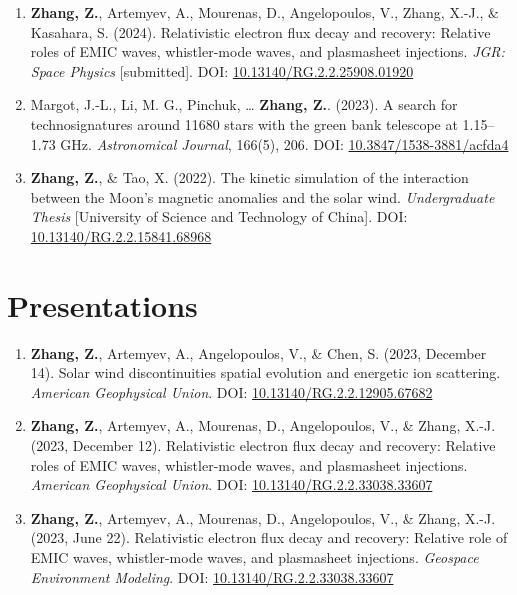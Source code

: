 \documentclass[
  letterpaper,
  DIV=11,
  numbers=noendperiod]{scrartcl}
\begin{document}
\begin{enumerate}
\def\labelenumi{\arabic{enumi}.}
\item
  \textbf{Zhang, Z.}, Artemyev, A., Mourenas, D., Angelopoulos, V., Zhang, X.-J., \& Kasahara, S. (2024). Relativistic electron flux decay and recovery: Relative roles of EMIC waves, whistler-mode waves, and plasmasheet injections. \emph{JGR: Space Physics} {[}submitted{]}. DOI: \href{https://doi.org/10.13140/RG.2.2.25908.01920}{10.13140/RG.2.2.25908.01920}
\item
  Margot, J.-L., Li, M. G., Pinchuk, \ldots{} \textbf{Zhang, Z.}. (2023). A search for technosignatures around 11680 stars with the green bank telescope at 1.15--1.73 GHz. \emph{Astronomical Journal}, 166(5), 206. DOI: \href{https://doi.org/10.3847/1538-3881/acfda4}{10.3847/1538-3881/acfda4}
\item
  \textbf{Zhang, Z.}, \& Tao, X. (2022). The kinetic simulation of the interaction between the Moon's magnetic anomalies and the solar wind. \emph{Undergraduate Thesis} {[}University of Science and Technology of China{]}. DOI: \href{http://dx.doi.org/10.13140/RG.2.2.15841.68968}{10.13140/RG.2.2.15841.68968}
\end{enumerate}

\section{Presentations}\label{presentations}

\begin{enumerate}
\def\labelenumi{\arabic{enumi}.}
\item
  \textbf{Zhang, Z.}, Artemyev, A., Angelopoulos, V., \& Chen, S. (2023, December 14). Solar wind discontinuities spatial evolution and energetic ion scattering. \emph{American Geophysical Union}. DOI: \href{https://doi.org/10.13140/RG.2.2.12905.67682}{10.13140/RG.2.2.12905.67682}
\item
  \textbf{Zhang, Z.}, Artemyev, A., Mourenas, D., Angelopoulos, V., \& Zhang, X.-J. (2023, December 12). Relativistic electron flux decay and recovery: Relative roles of EMIC waves, whistler-mode waves, and plasmasheet injections. \emph{American Geophysical Union}. DOI: \href{https://doi.org/10.13140/RG.2.2.33038.33607}{10.13140/RG.2.2.33038.33607}
\item
  \textbf{Zhang, Z.}, Artemyev, A., Mourenas, D., Angelopoulos, V., \& Zhang, X.-J. (2023, June 22). Relativistic electron flux decay and recovery: Relative role of EMIC waves, whistler-mode waves, and plasmasheet injections. \emph{Geospace Environment Modeling}. DOI: \href{http://dx.doi.org/10.13140/RG.2.2.33038.33607}{10.13140/RG.2.2.33038.33607}
\end{enumerate}
\end{document}
